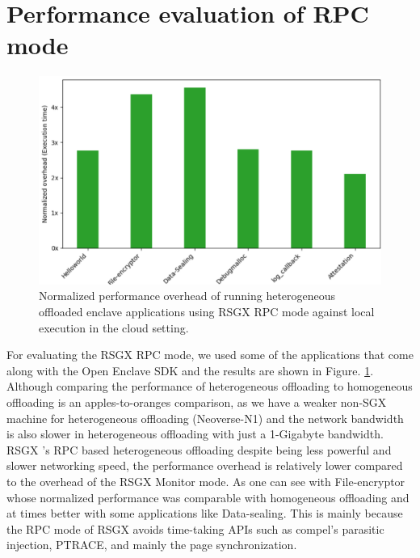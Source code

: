 \documentclass[article, doublespace,nopageskip]{VTthesis} %
\newcommand{\monitor}{RSGX \xspace}
\begin{document}
    \section{Performance evaluation of RPC mode} \label{sse:Performance evaluation of RPC mode}
        \begin{figure}[htb]
            \centering
            \includegraphics[scale=0.7]{figures/Normalized_performance_rpc.png}
            \caption{Normalized performance overhead of running heterogeneous offloaded enclave applications using \monitor RPC mode against local execution in the cloud setting.} 
            \label{fig:rpc_enclave_offloading}
        \end{figure}

    For evaluating the \monitor RPC mode, we used some of the applications that come along with the Open Enclave SDK and the results are shown in Figure. \ref{fig:rpc_enclave_offloading}. Although comparing the performance of heterogeneous offloading to homogeneous offloading is an apples-to-oranges comparison, as we have a weaker non-SGX machine for heterogeneous offloading (Neoverse-N1) and the network bandwidth is also slower in heterogeneous offloading with just a 1-Gigabyte bandwidth. \monitor's RPC based heterogeneous offloading despite being less powerful and slower networking speed, the performance overhead is relatively lower compared to the overhead of the \monitor Monitor mode. As one can see with File-encryptor whose normalized performance was comparable with homogeneous offloading and at times better with some applications like Data-sealing. This is mainly because the RPC mode of \monitor avoids time-taking APIs such as compel's parasitic injection, PTRACE, and mainly the page synchronization.
    
    
\end{document}

